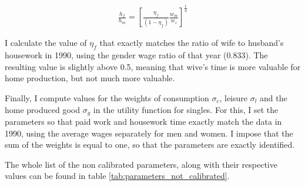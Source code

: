 \documentclass[12pt]{article}
\begin{document}
\begin{align*}
	\frac{h_f}{h_m}=\left[\frac{\eta_f}{\left(1-\eta_f\right)}\frac{w_m}{w_z}\right]^{\frac{1}{\eta}}
\end{align*}

I calculate the value of $\eta_f$ that exactly matches the ratio of wife to husband's housework in 1990, using the gender wage ratio of that year (0.833). The resulting value is slightly above 0.5, meaning that wive's time is more valuable for home production, but not much more valuable.

Finally, I compute values for the weights of consumption $\sigma_c$, leisure $\sigma_l$ and the home produced good $\sigma_g$ in the utility function for singles. For this, I set the parameters so that paid work and housework time exactly match the data in 1990, using the average wages separately for men and women. I impose that the sum of the weights is equal to one, so that the parameters are exactly identified. 

The whole list of the non calibrated parameters, along with their respective values can be found in table \ref{tab:parameters_not_calibrated}. 
\end{document}
